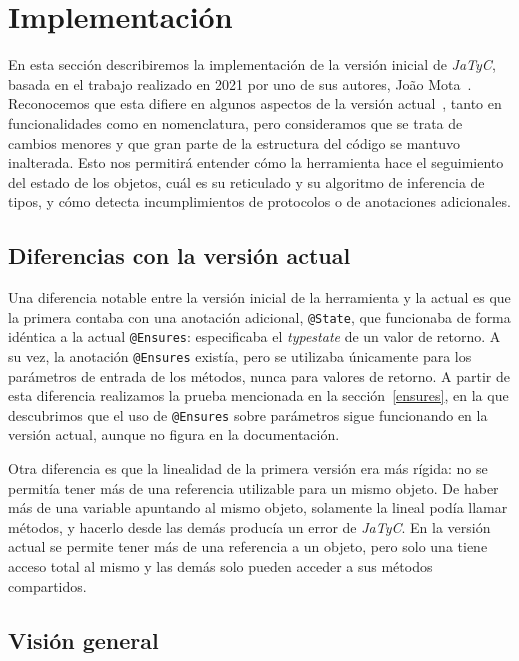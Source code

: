 \section{Implementación}
\label{implementacion}

En esta sección describiremos la implementación de la versión inicial de \textit{JaTyC}, basada en el trabajo realizado en 2021 por uno de sus autores, João Mota~\cite{jatyc:msc-thesis}. Reconocemos que esta difiere en algunos aspectos de la versión actual~\cite{jatyc:github}, tanto en funcionalidades como en nomenclatura, pero consideramos que se trata de cambios menores y que gran parte de la estructura del código se mantuvo inalterada. Esto nos permitirá entender cómo la herramienta hace el seguimiento del estado de los objetos, cuál es su reticulado y su algoritmo de inferencia de tipos, y cómo detecta incumplimientos de protocolos o de anotaciones adicionales.

\subsection{Diferencias con la versión actual}

Una diferencia notable entre la versión inicial de la herramienta y la actual es que la primera contaba con una anotación adicional, \texttt{@State}, que funcionaba de forma idéntica a la actual \texttt{@Ensures}: especificaba el \textit{typestate} de un valor de retorno. A su vez, la anotación \texttt{@Ensures} existía, pero se utilizaba únicamente para los parámetros de entrada de los métodos, nunca para valores de retorno. A partir de esta diferencia realizamos la prueba mencionada en la sección~\ref{ensures}, en la que descubrimos que el uso de \texttt{@Ensures} sobre parámetros sigue funcionando en la versión actual, aunque no figura en la documentación.

Otra diferencia es que la linealidad de la primera versión era más rígida: no se permitía tener más de una referencia utilizable para un mismo objeto. De haber más de una variable apuntando al mismo objeto, solamente la lineal podía llamar métodos, y hacerlo desde las demás producía un error de \textit{JaTyC}. En la versión actual se permite tener más de una referencia a un objeto, pero solo una tiene acceso total al mismo y las demás solo pueden acceder a sus métodos compartidos.

\subsection{Visión general}

